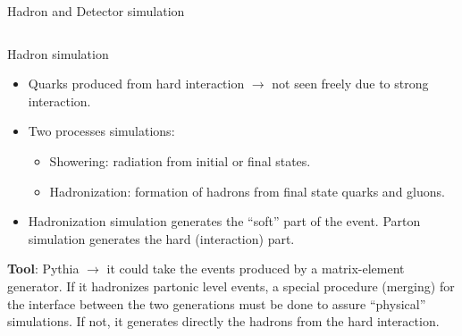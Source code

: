 \begin{frame}{Hadron and Detector simulation}
\vspace{-.2cm}

\begin{columns}
\begin{column}{.50\textwidth}
  \begin{block}{Hadron simulation}\scriptsize
    \begin{itemize}
    \item Quarks produced from hard interaction $\to$ not seen freely due to strong interaction.
    \item Two processes simulations:
      \begin{itemize}\scriptsize
      \item Showering: radiation from initial or final states.
      \item Hadronization: formation of hadrons from final state quarks and gluons.
      \end{itemize}
    \item Hadronization simulation generates the ``soft'' part of the event. Parton simulation generates the hard (interaction) part.
    \end{itemize}
  \end{block}
\vspace{-.3cm}
\begin{block}{}\tiny
\textbf{Tool}: Pythia $\to$ it could take the events produced by a matrix-element generator. If it hadronizes partonic level events, a special procedure (merging) for the interface between the two generations must be done to assure ``physical'' simulations. If not, it generates directly the hadrons from the hard interaction.
\end{block}
\end{column}


\end{columns}
\end{frame}
